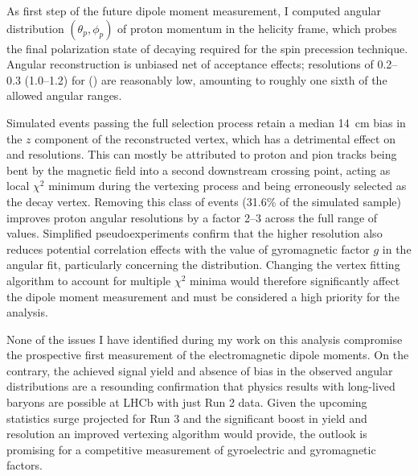 As first step of the future \lz dipole moment measurement, I computed angular distribution $(\theta_p, \phi_p)$ of proton momentum in the \lz helicity frame, which probes the final polarization state of decaying \lz required for the spin precession technique.
Angular reconstruction is unbiased net of acceptance effects;
resolutions of 0.2--0.3 (1.0--1.2) for \cthetap (\phip) are reasonably low, amounting to roughly one sixth of the allowed angular ranges.

Simulated \demonstratorshort events passing the full selection process retain a median \SI{14}{\centi\meter} bias in the $z$ component of the reconstructed \lambdadecay vertex, which has a detrimental effect on \cthetap and \phip resolutions.
This can mostly be attributed to proton and pion tracks being bent by the magnetic field into a second downstream crossing point, acting as local $\chi^2$ minimum during the vertexing process and being erroneously selected as the \lz decay vertex.
Removing this class of events (31.6\% of the simulated sample) improves proton angular resolutions by a factor 2--3 across the full range of values.
Simplified pseudoexperiments confirm that the higher resolution also reduces potential correlation effects with the value of gyromagnetic factor $g$ in the angular fit, particularly concerning the \phip distribution.
Changing the vertex fitting algorithm to account for multiple $\chi^2$ minima would therefore significantly affect the dipole moment measurement and must be considered a high priority for the analysis.

None of the issues I have identified during my work on this analysis compromise the prospective first measurement of the \lz electromagnetic dipole moments.
On the contrary, the achieved signal yield and absence of bias in the observed angular distributions are a resounding confirmation that physics results with long-lived \lz baryons are possible at LHCb with just Run 2 data.
Given the upcoming statistics surge projected for Run 3 and the significant boost in yield and resolution an improved vertexing algorithm would provide, the outlook is promising for a competitive measurement of \lz gyroelectric and gyromagnetic factors.